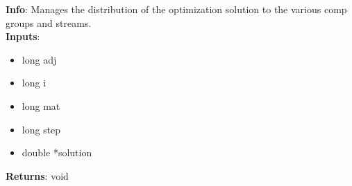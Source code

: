 \textbf{Info}: Manages the distribution of the optimization solution to the
various comp groups and streams. \\

\noindent \textbf{Inputs}:
\begin{itemize}
\item{long adj}
\item{long i}
\item{long mat}
\item{long step}
\item{double *solution}
\end{itemize}

\noindent \textbf{Returns}: void
